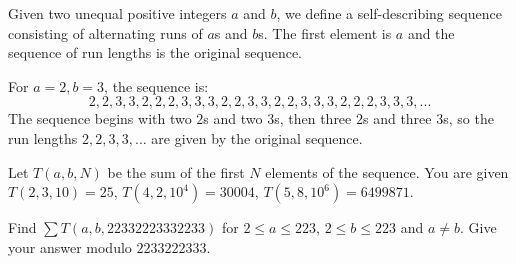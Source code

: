 Given two unequal positive integers $a$ and $b$, we define a self-describing sequence consisting of alternating runs of $a$s and $b$s. The first element is $a$ and the sequence of run lengths is the original sequence.

For $a=2, b=3$, the sequence is: 
$$2, 2, 3, 3, 2, 2, 2, 3, 3, 3, 2, 2, 3, 3, 2, 2, 3, 3, 3, 2, 2, 2, 3, 3, 3,...$$
The sequence begins with two $2$s and two $3$s, then three $2$s and three $3$s, so the run lengths $2, 2, 3, 3, ...$ are given by the original sequence.

Let $T(a, b, N)$ be the sum of the first $N$ elements of the sequence. You are given $T(2,3,10) = 25$, $T(4,2,10^4) = 30004$, $T(5,8,10^6) = 6499871$.

Find $\sum T(a, b, 22332223332233)$ for $2 \le a \le 223$, $2 \le b \le 223$ and $a \neq b$. Give your answer modulo $2233222333$.
